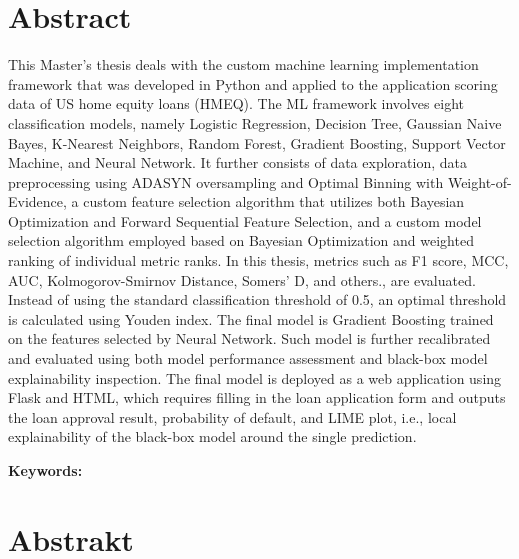 \section*{Abstract}


This Master's thesis deals with the custom machine learning implementation framework that was developed in Python and applied to the application scoring data of US home equity loans (HMEQ).
The ML framework involves eight classification models, namely Logistic Regression, Decision Tree, Gaussian Naive Bayes, K-Nearest Neighbors, Random Forest, Gradient Boosting, Support Vector Machine, and Neural Network.
It further consists of data exploration, data preprocessing using ADASYN oversampling and Optimal Binning with Weight-of-Evidence, a custom feature selection algorithm that utilizes both Bayesian Optimization and Forward Sequential Feature Selection, and a custom model selection algorithm employed based on Bayesian Optimization and weighted ranking of individual metric ranks. In this thesis, metrics such as F1 score, MCC, AUC, Kolmogorov-Smirnov Distance, Somers' D, and others., are evaluated.
Instead of using the standard classification threshold of 0.5, an optimal threshold is calculated using Youden index.
The final model is Gradient Boosting trained on the features selected by Neural Network. 
Such model is further recalibrated and evaluated using both model performance assessment and black-box model explainability inspection.
The final model is deployed as a web application using Flask and HTML, which requires filling in the loan application form and outputs the loan approval result, probability of default, and LIME plot, i.e., local explainability of the black-box model around the single prediction.
\bigskip

\textbf{Keywords:} \Keywords


\bigskip

\newpage
\section*{Abstrakt}\label{abstract}


